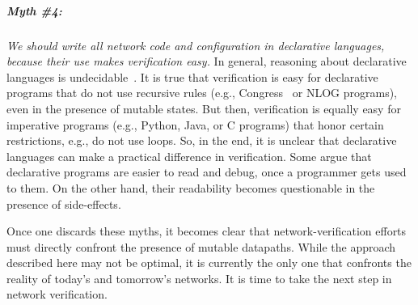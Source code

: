 \subparagraph*{Myth \#4:} \emph{We should write all network code and configuration in declarative languages, because their use makes verification easy.} In general, reasoning about declarative languages is undecidable~\cite{Halevy}. It is true that verification is easy for declarative programs that do not use recursive rules (e.g., Congress~\cite{congress} or NLOG programs), even in the presence of mutable states. But then, verification is equally easy for imperative programs (e.g., Python, Java, or C programs) that honor certain restrictions, e.g., do not use loops. So, in the end, it is unclear that declarative languages can make a practical difference in verification. Some argue that declarative programs are easier to read and debug, once a programmer gets used to them. On the other hand, their readability becomes questionable in the presence of side-effects.


Once one discards these myths, it becomes clear that network-verification efforts must directly confront the presence of mutable datapaths. While the approach described here may not be optimal, it is currently the only one that confronts the reality of today's and tomorrow's networks. It is time to take the next step in network verification.
